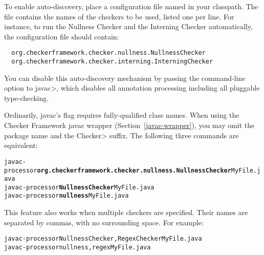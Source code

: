 \begin{sloppypar}
To enable auto-discovery, place a configuration file named
in your classpath.  The file contains the names of the checkers to
be used, listed one per line.  For instance, to run the Nullness Checker and the
Interning Checker automatically, the configuration file should contain:
\end{sloppypar}

\begin{smaller}
\begin{Verbatim}
  org.checkerframework.checker.nullness.NullnessChecker
  org.checkerframework.checker.interning.InterningChecker
\end{Verbatim}
\end{smaller}

You can disable this auto-discovery mechanism by passing the
 command-line option to \<javac>, which disables all
annotation processing including all pluggable type-checking.





Ordinarily, javac's  flag requires fully-qualified class names.
When using the Checker Framework javac wrapper (Section~\ref{javac-wrapper}), you may
omit the package name and the \<Checker> suffix.
The following three commands are equivalent:

\begin{alltt}
  javac -processor \textbf{org.checkerframework.checker.nullness.NullnessChecker} MyFile.java
  javac -processor \textbf{NullnessChecker} MyFile.java
  javac -processor \textbf{nullness} MyFile.java
\end{alltt}

This feature also works when multiple checkers are specified.
Their names are separated by commas, with no surrounding space.
For example:

\begin{alltt}
  javac -processor NullnessChecker,RegexChecker MyFile.java
  javac -processor nullness,regex MyFile.java
\end{alltt}

